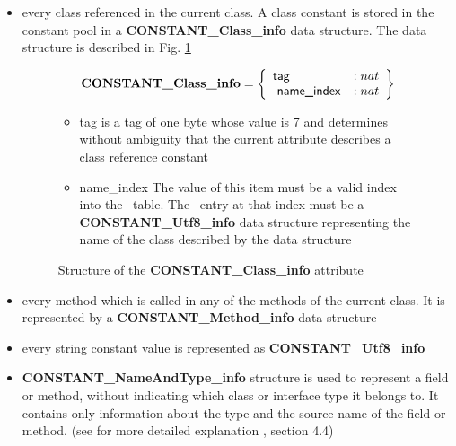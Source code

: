 \begin{itemize}
\item every class referenced in the current class.  A class constant is stored in the constant pool
         in a  \textbf{CONSTANT\_Class\_info} data structure. The data structure is described in Fig. \ref{clsConstant} 
  \begin{figure}
$$
\mbox{\rm\textbf{CONSTANT\_Class\_info}} =  \left\{\begin{array}{ll} 
                                                   \mbox{\rm\textsf{tag}}    & :   nat \\
                                                   \mbox{\rm\textsf{ name\_index}}     & :   nat \\
						  
	                        \end{array} \right\}$$

\begin{itemize}
\item \textsf{tag} is a tag of one byte  whose value is 7 and  determines without 
       ambiguity that the current attribute describes a class  reference constant

\item \textsf{name\_index} The value of this item must be a valid index into the \constantPool \ table. The \constantPool \ entry at that index must be a
       \textbf{ CONSTANT\_Utf8\_info} data structure representing the name of the class described by the data structure 
 \end{itemize}
\caption{ { \sc Structure of the } \textbf{CONSTANT\_Class\_info} { \sc attribute }  }
\label{clsConstant}
\end{figure}
  
 \item every method which is called in any of the methods
of the current class. It is represented by a  \textbf{CONSTANT\_Method\_info} data structure
      
	
\item  every string constant value is represented as \textbf{CONSTANT\_Utf8\_info}
\item  \textbf{CONSTANT\_NameAndType\_info}  structure is used to represent a field or method, without indicating which class or interface type it belongs to.
       It contains only information about the type and the source name of the field or  method. 
       (see for more detailed explanation \cite{VMSpec}, section 4.4) 

\end{itemize}

